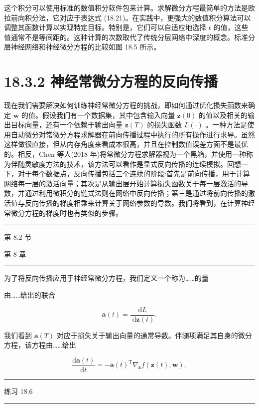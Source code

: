 \documentclass[10pt]{article}
\newcommand{\HRule}{\begin{center}\rule{0.9\linewidth}{0.2mm}\end{center}}
\begin{document}
这个积分可以使用标准的数值积分软件包来计算。求解微分方程最简单的方法是欧拉前向积分法，它对应于表达式 (18.21)。在实践中，更强大的数值积分算法可以调整其函数计算以实现特定目标。特别是，它们可以自适应地选择 \(t\) 的值，这些值通常不是等间距的。这种计算的次数取代了传统分层网络中深度的概念。标准分层神经网络和神经微分方程的比较如图 18.5 所示。

\section*{18.3.2 神经常微分方程的反向传播}

现在我们需要解决如何训练神经常微分方程的挑战，即如何通过优化损失函数来确定 \(\mathbf{w}\) 的值。假设我们有一个数据集，其中包含输入向量 \(\mathbf{z}\left( 0\right)\) 的值以及相关的输出目标向量，还有一个依赖于输出向量 \(\mathbf{z}\left( T\right)\) 的损失函数 \(L\left( \cdot \right)\) 。一种方法是使用自动微分对常微分方程求解器在前向传播过程中执行的所有操作进行求导。虽然这样做很直接，但从内存角度来看成本很高，并且在控制数值误差方面不是最优的。相反，Chen 等人(2018 年)将常微分方程求解器视为一个黑箱，并使用一种称为伴随灵敏度方法的技术，该方法可以看作是显式反向传播的连续模拟。回想一下，对于每个数据点，反向传播包括三个连续的阶段:首先是前向传播，用于计算网络每一层的激活向量；其次是从输出层开始计算损失函数关于每一层激活的导数，并通过利用微积分的链式法则在网络中反向传播；第三是通过将前向传播的激活值与反向传播的梯度相乘来计算关于网络参数的导数。我们将看到，在计算神经常微分方程的梯度时也有类似的步骤。

\HRule

第 8.2 节

第 8 章

\HRule

为了将反向传播应用于神经常微分方程，我们定义一个称为……的量

由……给出的联合

\[
\mathbf{a}\left( t\right)  = \frac{\mathrm{d}L}{\mathrm{\;d}\mathbf{z}\left( t\right) }. \tag{18.24}
\]

我们看到 \(\mathbf{a}\left( T\right)\) 对应于损失关于输出向量的通常导数。伴随项满足其自身的微分方程，该方程由……给出

\[
\frac{\mathrm{d}\mathbf{a}\left( t\right) }{\mathrm{d}t} =  - \mathbf{a}{\left( t\right) }^{\mathrm{T}}{\nabla }_{\mathbf{z}}f\left( {\mathbf{z}\left( t\right) ,\mathbf{w}}\right) , \tag{18.25}
\]

\HRule

练习 18.6

\HRule
\end{document}
